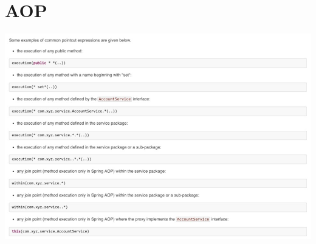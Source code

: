 \documentclass[a4paper,10pt]{scrreprt}
\begin{document}
\chapter{AOP}
 \includegraphics[scale=0.4,keepaspectratio=true]{aop_ex.jpeg}
\end{document}
